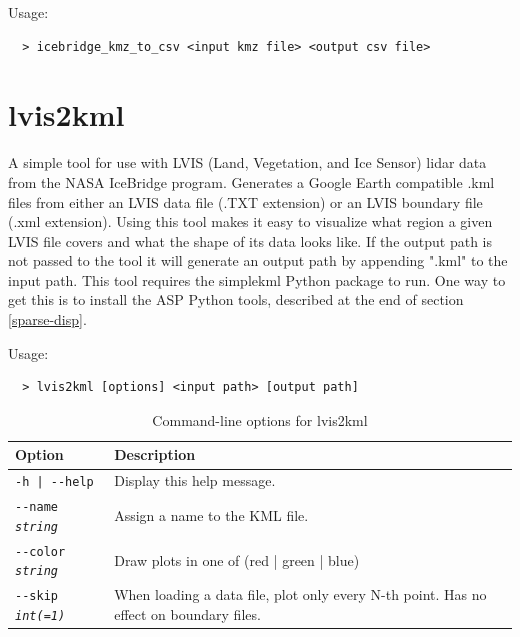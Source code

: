 Usage:
\begin{verbatim}
  > icebridge_kmz_to_csv <input kmz file> <output csv file>
\end{verbatim}



\section{lvis2kml}
\label{lvis2kml}

A simple tool for use with LVIS (Land, Vegetation, and Ice Sensor) lidar data from the
NASA IceBridge program.  Generates a Google Earth compatible .kml files from either
an LVIS data file (.TXT extension) or an LVIS boundary file (.xml extension).  Using
this tool makes it easy to visualize what region a given LVIS file covers and what
the shape of its data looks like.  If the output path is not passed to the tool it
will generate an output path by appending ".kml" to the input path.  This tool requires
the simplekml Python package to run.  One way to get this is to install the ASP Python
tools, described at the end of section \ref{sparse-disp}.

Usage:
\begin{verbatim}
  > lvis2kml [options] <input path> [output path]
\end{verbatim}


\begin{longtable}{|l|p{7.5cm}|}
\caption{Command-line options for lvis2kml}
\label{tbl:lvis2kml}
\endfirsthead
\endhead
\endfoot
\endlastfoot
\hline
Option & Description \\ \hline \hline
\texttt{-h | -\/-help } & Display this help message.\\ \hline
\texttt{-\/-name  \textit{string}} & Assign a name to the KML file.\\ \hline
\texttt{-\/-color  \textit{string}} & Draw plots in one of (red | green | blue)\\ \hline
\texttt{-\/-skip  \textit{int(=1)}} & When loading a data file, plot only every N-th point.
Has no effect on boundary files.\\ \hline
\end{longtable}

